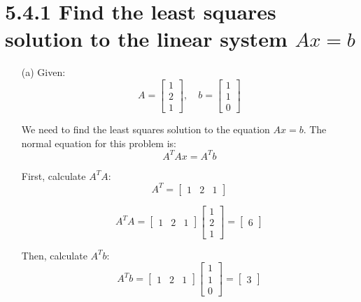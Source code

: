 \documentclass[12pt]{article}
\begin{document}
\section*{5.4.1 Find the least squares solution to the linear system $Ax = b$}

\begin{enumerate}
  \item[(a)]
    Given:
    \[
      A = \begin{bmatrix} 1 \\ 2 \\ 1 \end{bmatrix}, \quad b = \begin{bmatrix} 1 \\ 1 \\ 0 \end{bmatrix}
    \]


    We need to find the least squares solution to the equation \( Ax = b \). The normal equation for this problem is:
    \[
      A^T A x = A^T b
    \]

    First, calculate \( A^T A \):
    \[
      A^T = \begin{bmatrix} 1 & 2 & 1 \end{bmatrix}
    \]

    \[
      A^T A = \begin{bmatrix} 1 & 2 & 1 \end{bmatrix} \begin{bmatrix} 1 \\ 2 \\ 1 \end{bmatrix} = \begin{bmatrix} 6 \end{bmatrix}
    \]

    Then, calculate \( A^T b \):
    \[
      A^T b = \begin{bmatrix} 1 & 2 & 1 \end{bmatrix} \begin{bmatrix} 1 \\ 1 \\ 0 \end{bmatrix} = \begin{bmatrix} 3 \end{bmatrix}
    \]


\end{enumerate}
\end{document}
